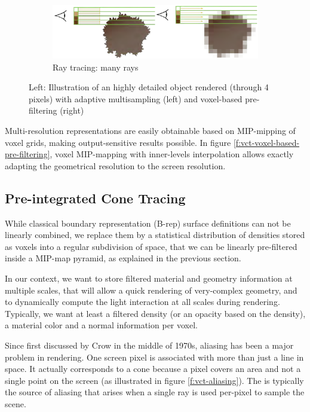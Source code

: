 \begin{figure}\label{f:vct-voxel-based-pre-filtering}
	\begin{subfigure}[b]{1.\textwidth}
		\includegraphics{graphics/vct/vct-4-3}
		\caption{Ray tracing: many rays}
	\end{subfigure}
	\caption{Left: Illustration of an highly detailed object rendered (through 4 pixels) with adaptive multisampling (left) and voxel-based pre-filtering (right)}
\end{figure}

Multi-resolution representations are easily obtainable based on MIP-mipping of voxel grids, making output-sensitive results possible. In figure \ref{f:vct-voxel-based-pre-filtering}, voxel MIP-mapping with inner-levels interpolation allows exactly adapting the geometrical resolution to the screen resolution.




\subsection{Pre-integrated Cone Tracing}
While classical boundary representation (B-rep) surface definitions can not be linearly combined, we replace them by a statistical distribution of densities stored as voxels into a regular subdivision of space, that we can be linearly pre-filtered inside a MIP-map pyramid, as explained in the previous section.

In our context, we want to store filtered material and geometry information at multiple scales, that will allow a quick rendering of very-complex geometry, and to dynamically compute the light interaction at all scales during rendering. Typically, we want at least a filtered density (or an opacity based on the density), a material color and a normal information per voxel.

Since first discussed by Crow\cite{a:Thealiasingproblemincomputer-generatedshadedimages} in the middle of 1970s, aliasing has been a major problem in rendering. One screen pixel is associated with more than just a line in space. It actually corresponds to a cone because a pixel covers an area and not a single point on the screen (as illustrated in figure \ref{f:vct-aliasing}). The is typically the source of aliasing that arises when a single ray is used per-pixel to sample the scene.

